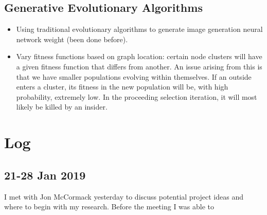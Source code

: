 \documentclass[10pt,a4paper]{article}
\begin{document}
\subsection{Generative Evolutionary Algorithms}
\begin{itemize}
	\item Using traditional evolutionary algorithms to generate image generation neural network weight (been done before).
	\item Vary fitness functions based on graph location: certain node clusters will have a given fitness function that differs from another.
	An issue arising from this is that we have smaller populations evolving within themselves.
	If an outside enters a cluster, its fitness in the new population will be, with high probability, extremely low.
	In the proceeding selection iteration, it will most likely be killed by an insider.
	
\end{itemize}


\pagebreak
\section{Log}

\subsection{21-28 Jan 2019}

I met with Jon McCormack yesterday to discuss potential project ideas and where to begin with my research.
Before the meeting I was able to


\pagebreak
\end{document}
